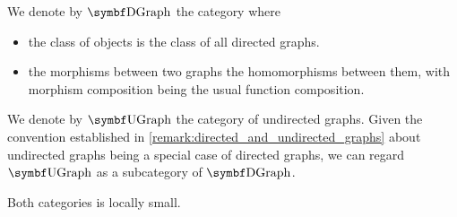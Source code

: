 \begin{definition}\label{def:category_of_graphs}
  We denote by \( \Cat{DGraph} \) the category where
  \begin{itemize}
    \item the class of objects is the class of all directed graphs.
    \item the morphisms between two graphs the homomorphisms between them, with morphism composition being the usual function composition.
  \end{itemize}

  We denote by \( \Cat{UGraph} \) the category of undirected graphs. Given the convention established in \cref{remark:directed_and_undirected_graphs} about undirected graphs being a special case of directed graphs, we can regard \( \Bold{UGraph} \) as a subcategory of \( \Bold{DGraph} \).

  Both categories is locally small.
\end{definition}
